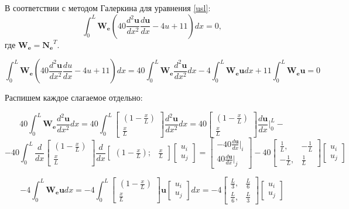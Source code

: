 В соответствии с методом Галеркина для уравнения \ref{usl}:
\begin{equation}\label{lin}
\int_0^L \mathbf{W_e}\left( 40\frac{d^2\mathbf{u}}{dx^2} \frac{d\mathbf{u}}{dx}  -4u     +11 \right) d x=0,
\end{equation}
где $\mathbf{W_e=N_e}^T$.

$$\int_0^L \mathbf{W_e}\left(40\frac{d^2\mathbf{u}}{dx^2} \frac{du}{dx}  -4u     +11 \right) d x = 40\int_0^L \mathbf{W_e} \frac{d^2 \mathbf{u}}{dx^2} dx    -4 \int_0^L \mathbf{W_e u} d x     +11 \int_0^L \mathbf{W_e u} =0$$

Распишем каждое слагаемое отдельно:

$$
40\int_0^L \mathbf{W_e} \frac{d^2 \mathbf{u}}{dx^2} dx=40\int_0^L
	\begin{bmatrix}
	(1-\frac{x}{L}) \\
	\frac{x}{L}
	\end{bmatrix}
\frac{d^2 \mathbf{u}}{dx^2} dx =
40
	\begin{bmatrix}
	(1-\frac{x}{L}) \\
	\frac{x}{L}
	\end{bmatrix}
\frac{d\mathbf{u}}{dx} |_0^L -
$$
$$
  -40  \int_0^L
\frac{d}{dx}
	\begin{bmatrix}
	(1-\frac{x}{L}) \\
	\frac{x}{L}
	\end{bmatrix}
\frac{d}{dx}
	\begin{bmatrix}
	(1-\frac{x}{L}); & \frac{x}{L}
	\end{bmatrix}
	\begin{bmatrix}
	u_i \\
	u_j
	\end{bmatrix}
=
	\begin{bmatrix}
	  -40 \frac{d\mathbf{u}}{dx}|_i \\
40\frac{d\mathbf{u}}{dx}|_j
	\end{bmatrix}   -40 
\begin{bmatrix}
\frac{1}{L}, & -\frac{1}{L} \\
-\frac{1}{L}, & \frac{1}{L}
\end{bmatrix}
\begin{bmatrix}
u_i \\
u_j
\end{bmatrix}
$$





$$
 -4  
\int_0^L \mathbf{W_e} \mathbf{u} dx=
 -4  
\int_0^L
\begin{bmatrix}
	(1-\frac{x}{L}) \\
	\frac{x}{L}
\end{bmatrix}
\mathbf{u}
\begin{bmatrix}
	u_i \\
	u_j
\end{bmatrix}
dx
=
 -4  
\begin{bmatrix}
\frac{L}{3}, & \frac{L}{6} \\
\frac{L}{6}, & \frac{L}{3}
\end{bmatrix}
\begin{bmatrix}
u_i \\
u_j
\end{bmatrix}
$$



